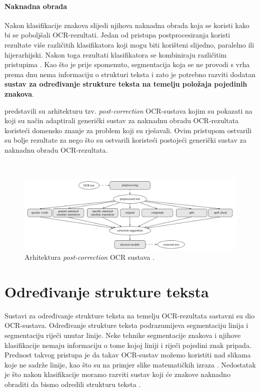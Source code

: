 \documentclass[times, utf8, zavrsni]{fer}
\begin{document}
\subsubsection{Naknadna obrada}
Nakon klasifikacije znakova slijedi njihova naknadna obrada koja se koristi kako
bi se poboljšali OCR-rezultati. Jedan od pristupa postprocesiranja koristi
rezultate više različitih klasifikatora koji mogu biti korišteni slijedno,
paralelno ili hijerarhijski. Nakon toga rezultati klasifikatora se kombiniraju
različitim pristupima \citep{DBLP:journals/corr/abs-1710-05703}. Kao što je
prije spomenuto, segmentacija koja se ne provodi s vrha
prema dnu nema informaciju o strukturi teksta i zato je potrebno razviti dodatan
\textbf{sustav za određivanje strukture teksta na temelju položaja pojedinih
znakova}.

\citep{schulz2017multi} predstavili su arhitekturu
tzv. \emph{post-correction} OCR-sustava kojim su pokazati na koji su način
adaptirali generički sustav za naknadnu obradu OCR-rezultata koristeći domensko
znanje za problem koji su rješavali. Ovim pristupom ostvarili su bolje
rezultate za nego što su ostvarili koristeći postojeći
generički sustav za naknadnu obradu OCR-rezultata.

\

\begin{figure}[htb]
    \centering
    \includegraphics[width=\textwidth]{images/post-correction-example-01.png}
    \caption{
        Arhitektura \emph{post-correction} OCR sustava \citep{schulz2017multi}.
    }
    \label{fig:post-correction-example-01}
\end{figure}
















\chapter{Određivanje strukture teksta}
Sustavi za određivanje strukture teksta na temelju OCR-rezultata sastavni su
dio OCR-sustava. Određivanje strukture teksta podrazumijeva segmentaciju linija
i segmentaciju riječi unutar linije. Neke tehnike segmentacije znakova i
njihove klasifikacije nemaju informaciju o tome kojoj liniji i riječi pojedini
znak pripada. Prednost takvog pristupa je da takav OCR-sustav možemo koristiti
nad slikama koje ne sadrže linije, kao što su na primjer slike matematičkih
izraza \citep{Jurin:2017:Master}. Nedostatak je što nakon klasifikacije moramo
razviti sustav koji će znakove naknadno obraditi da bismo odredili strukturu
teksta \citep{Jurin:2017:Master}.
\end{document}

